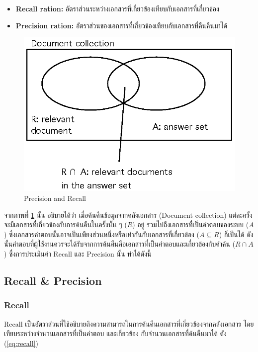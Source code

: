 \documentclass[11pt,a4paper]{article}
\begin{document}
{{{\begin{itemize}
    \item {\bf Recall ration:} อัตราส่วนระหว่างเอกสารที่เกี่ยวข้องเทียบกับเอกสารที่เกี่ยวข้อง
    \item {\bf Precision ration:} อัตราส่วนของเอกสารที่เกี่ยวข้องเทียบกับเอกสารที่คืนคืนมาได้
\end{itemize}

\begin{figure}[ht!]
    \centering
    \includegraphics{precision-and-recall.eps}
    \caption{Precision and Recall}
    \label{fig:precisionandrecall}
\end{figure}

จากภาพที่ \ref{fig:precisionandrecall} นั้น อธิบายได้ว่า เมื่อค้นคืนข้อมูลจากคลังเอกสาร (Document collection) แต่ละครั้ง 
จะมีเอกสารที่เกี่ยวข้องกับการค้นคืนในครั้งนั้น ๆ ($R$) อยู่ รวมไปถึงเอกสารที่เป็นคำตอบของระบบ ($A$)
ซึ่งเอกสารคำตอบนั้นอาจเป็นเพียงส่วนหนึ่งหรือเท่ากันกับเอกสารที่เกี่ยวข้อง ($A \subseteq R$) ก็เป็นได้ 
ดังนั้นคำตอบที่ผู้ใช้งานควรจะได้รับจากการค้นคืนคือเอกสารที่เป็นคำตอบและเกี่ยวข้องกับคำค้น ($R \cap A$) ซึ่งการประเมินค่า Recall 
และ Precision นั้น ทำได้ดังนี้

\subsection{Recall \& Precision}

\subsubsection{Recall}

Recall เป็นอัตราส่วนที่ใช้อธิบายถึงความสามารถในการค้นคืนเอกสารที่เกี่ยวข้องจากคลังเอกสาร โดยเทียบระหว่างจำนวนเอกสารที่เป็นคำตอบ
และเกี่ยวข้อง กับจำนวนเอกสารที่ค้นคืนมาได้ ดัง (\ref{eq:recall})

}}}
\end{document}
